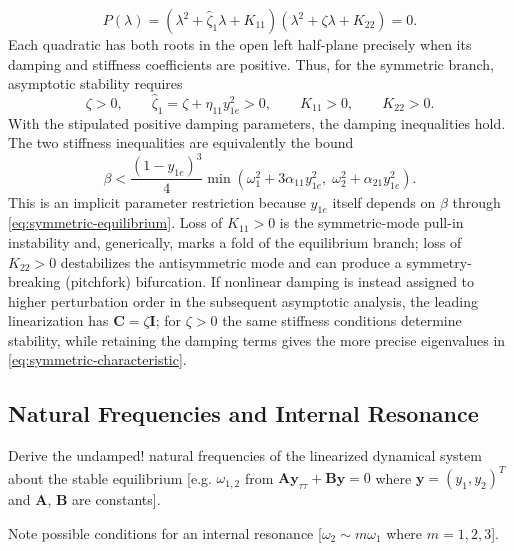 \documentclass[11pt]{article}
\newenvironment{assignmentinstruction}{\par\begingroup\color{blue}}{\par\endgroup}
\begin{document}
\begin{equation}\label{eq:symmetric-characteristic}
P(\lambda)=(\lambda^2+\widehat{\zeta}_1\lambda+K_{11})(\lambda^2+\zeta\lambda+K_{22})=0.
\end{equation}
Each quadratic has both roots in the open left half-plane precisely when its damping and stiffness coefficients are positive. Thus, for the symmetric branch, asymptotic stability requires
\begin{equation}\label{eq:stability-conditions}
\zeta>0,\qquad \widehat{\zeta}_1=\zeta+\eta_{11}y_{1e}^2>0,\qquad K_{11}>0,\qquad K_{22}>0.
\end{equation}
With the stipulated positive damping parameters, the damping inequalities hold. The two stiffness inequalities are equivalently the bound
\begin{equation}\label{eq:beta-stability-bound}
\beta<\frac{(1-y_{1e})^3}{4}\min\!\left(\omega_1^2+3\alpha_{11}y_{1e}^2,\;\omega_2^2+\alpha_{21}y_{1e}^2\right).
\end{equation}
This is an implicit parameter restriction because $y_{1e}$ itself depends on $\beta$ through \eqref{eq:symmetric-equilibrium}. Loss of $K_{11}>0$ is the symmetric-mode pull-in instability and, generically, marks a fold of the equilibrium branch; loss of $K_{22}>0$ destabilizes the antisymmetric mode and can produce a symmetry-breaking (pitchfork) bifurcation. If nonlinear damping is instead assigned to higher perturbation order in the subsequent asymptotic analysis, the leading linearization has $\mathbf{C}=\zeta\mathbf{I}$; for $\zeta>0$ the same stiffness conditions determine stability, while retaining the damping terms gives the more precise eigenvalues in \eqref{eq:symmetric-characteristic}.

\subsection{Natural Frequencies and Internal Resonance}
\begin{assignmentinstruction}
Derive the undamped! natural frequencies of the linearized dynamical system about the stable equilibrium [e.g. $\omega_{1,2}$ from $\mathbf{A}\mathbf{y}_{\tau\tau}+\mathbf{B}\mathbf{y}=0$ where $\mathbf{y}=(y_1,y_2)^T$ and $\mathbf{A}$, $\mathbf{B}$ are constants].

Note possible conditions for an internal resonance [$\omega_2\sim m\omega_1$ where $m=1,2,3$].
\end{assignmentinstruction}
\end{document}
